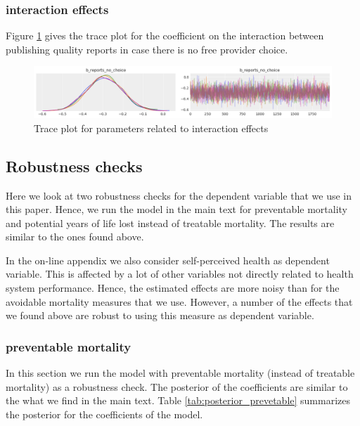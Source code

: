 \documentclass[a4paper,12pt]{article}
\begin{document}
\subsubsection{interaction effects}
\label{sec:orga3c1071}

Figure \ref{fig:trace_interaction} gives the trace plot for the coefficient on the interaction between publishing quality reports in case there is no free provider choice.

\begin{figure}[htbp]
\centering
\includegraphics[width=.9\linewidth]{./figures/trace_interaction.png}
\caption{\label{fig:trace_interaction}Trace plot for parameters related to interaction effects}
\end{figure}



\subsection{Robustness checks}
\label{sec:org5e4ecd8}
\label{app:robustness}

Here we look at two robustness checks for the dependent variable that we use in this paper. Hence, we run the model in the main text for preventable mortality and potential years of life lost instead of treatable mortality. The results are similar to the ones found above.

In the on-line appendix we also consider self-perceived health as dependent variable. This is affected by a lot of other variables not directly related to health system performance. Hence, the estimated effects are more noisy than for the avoidable mortality measures that we use. However, a number  of the effects that we found above are robust to using this measure as dependent variable.

\subsubsection{preventable mortality}
\label{sec:orgb677a8e}

In this section we run the model with preventable mortality (instead of treatable mortality) as a robustness check. The posterior of the coefficients are similar to the what we find in the main text. Table \ref{tab:posterior_prevetable} summarizes the posterior for the coefficients of the model.
\end{document}
